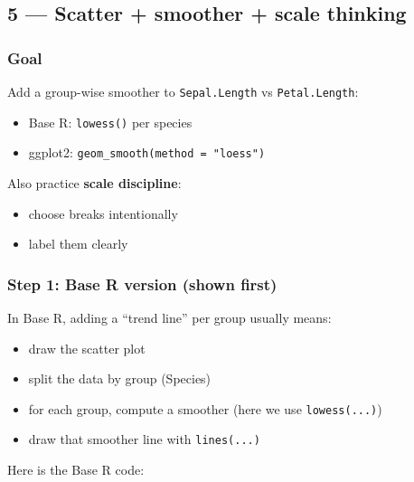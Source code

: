 \documentclass[
  letterpaper,
  DIV=11,
  numbers=noendperiod]{scrartcl}
\providecommand{\tightlist}{%
  \setlength{\itemsep}{0pt}\setlength{\parskip}{0pt}}\usepackage{longtable,booktabs,array}
\begin{document}
\subsection{5 --- Scatter + smoother + scale
thinking}\label{scatter-smoother-scale-thinking}

\subsubsection{Goal}\label{goal-4}

Add a group-wise smoother to \texttt{Sepal.Length} vs
\texttt{Petal.Length}:

\begin{itemize}
\tightlist
\item
  Base R: \texttt{lowess()} per species
\item
  ggplot2: \texttt{geom\_smooth(method\ =\ "loess")}
\end{itemize}

Also practice \textbf{scale discipline}:

\begin{itemize}
\tightlist
\item
  choose breaks intentionally
\item
  label them clearly
\end{itemize}

\subsubsection{Step 1: Base R version (shown
first)}\label{step-1-base-r-version-shown-first-4}

In Base R, adding a ``trend line'' per group usually means:

\begin{itemize}
\tightlist
\item
  draw the scatter plot
\item
  split the data by group (Species)
\item
  for each group, compute a smoother (here we use \texttt{lowess(...)})
\item
  draw that smoother line with \texttt{lines(...)}
\end{itemize}

Here is the Base R code:
\end{document}
